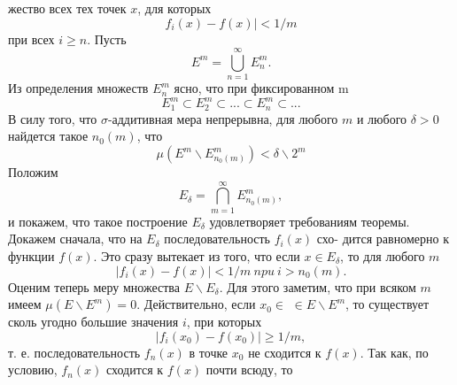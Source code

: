 \documentclass[a5paper]{book}
\begin{document}
жество всех тех точек $x$, для которых 
\begin{equation*} f_{i}(x)-f(x)|<1/m\end{equation*}
при всех $i\geqslant n$. Пусть 
\begin{equation*} E^m=\bigcup^\infty_{n=1}E^m_{n}.\end{equation*}
Из определения множеств $E^m_{n}$ ясно, что при фиксированном m \linebreak
\begin{equation*} E^m_{1}\subset E^m_{2}\subset ...\subset E^m_{n}\subset ...\end{equation*}
В силу того, что $\sigma$-аддитивная мера непрерывна, для любого \linebreak 
$m$ и любого $\delta>0$ найдется такое $n_{0}(m)$, что 
\begin{equation*} \mu(E^m\backslash E^m_{n_{0}(m)})<\delta\backslash 2^m\end{equation*}
Положим
\begin{equation*} E_{\delta}=\bigcap^\infty_{m=1}E^m_{n_{0}(m)},\end{equation*}
и покажем, что такое построение $E_{\delta}$ удовлетворяет требованиям \linebreak
теоремы. \newline 
\begin{equation*} \end{equation*}
\indent Докажем сначала, что на $E_{\delta}$ последовательность ${f_{i}(x)}$ схо- \linebreak 
дится равномерно к функции $f(x)$. Это сразу вытекает из того,\linebreak 
что если $x\in E_{\delta}$, то для любого $m$ 
\begin{equation*} |f_{i}(x)-f(x)|<1/m\ npu\ i>n_{0}(m).\end{equation*}
Оценим теперь меру множества $E\backslash E_{\delta}$. Для этого заметим, что \linebreak 
при всяком $m$ имеем $\mu(E\backslash E^m)=0$. Действительно, если $x_{0}\in$ \linebreak 
$\in E\backslash E^m$, то существует сколь угодно большие значения $i$, \linebreak 
при которых 
\begin{equation*} |f_{i}(x_{0})-f(x_{0})|\geqslant1/m,\end{equation*}
т. е. последовательность ${f_{n}(x)}$ в точке $x_{0}$ не сходится к $f(x)$. \linebreak 
Так как, по условию, ${f_{n}(x)}$ сходится к $f(x)$ почти всюду, то \newline 
\end{document}
